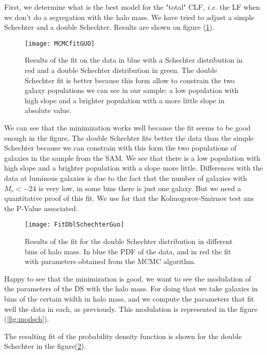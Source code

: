 First, we determine what is the best model for the "total" CLF, \textit{i.e.} the LF when we don't do a segregation with the halo
mass. We have tried to adjust a simple Schechter and a double Schechter. Results are shown on figure (\ref{fig:fitguo}).
\begin{figure}[ht]
	\centering
	\texttt{[image: MCMCfitGUO]}
	\caption{\footnotesize{}Results of the fit on the data in blue with a Schechter distribution in red and a double Schechter
	distribution in green. The double Schechter fit is better because this form allow to constrain the two galaxy populations we
	can see in our sample: a low population with high slope and a brighter population with a more little slope in absolute
	value.}
	\label{fig:fitguo}
\end{figure}
We can see that the minimization works well because the fit seems to be good enough in the figure. The double Schechter fits better
the data than the simple Schechter because we can constrain with this form the two populations of galaxies in the sample from the
\citet{Guo+11} SAM. We see that there is a low population with high slope and a brighter population with a slope more little.
Differences with the data at luminous galaxies is due to the fact that the number of galaxies with $M_r<-24$ is very low, in some
bins there is just one galaxy. But we need a quantitative proof of this fit. We use for that the Kolmogorov-Smirnov test ans the
P-Value associated.
\begin{figure}[ht]
	\centering
	\texttt{[image: FitDblSchechterGuo]}
	\caption{\footnotesize{}Results of the fit for the double Schechter distribution in different bins of halo mass. In blue the
	PDF of the data, and in red the fit with parameters obtained from the MCMC algorithm.}
	\label{fig:fitguodblsch}
\end{figure}

Happy to see that the minimization is good, we want to see the modulation of the parameters of the DS with the halo mass. For doing
that we take galaxies in bins of the certain width in halo mass, and we compute the parameters that fit well the data in each, as
previously. This modulation is represented in the figure (\ref{fig:modsch}).
\begin{figure*}[p]
	\centering
	\begin{minipage}{\linewidth}
	\centering
	\end{minipage}
	\begin{minipage}{\linewidth}
	\centering
	\end{minipage}
	\caption{\footnotesize{}Modulation of the parameters of both Schechter and double Schechter luminosity distributions with
	the halo mass.}
	\label{fig:modsch}
\end{figure*}
The resulting fit of the probability density function is shown for the double Schechter in the figure(\ref{fig:fitguodblsch}).

